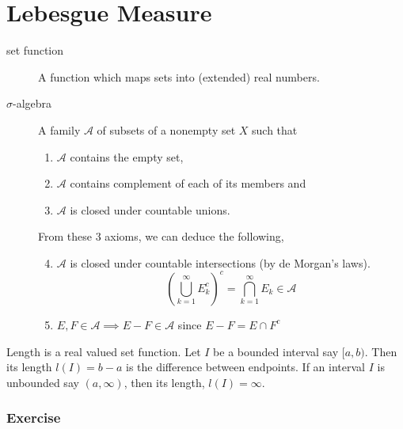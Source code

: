 \section{Lebesgue Measure}
\begin{description}
	\item[set function] A function which maps sets into (extended) real numbers.
	\item[$\sigma$-algebra] A family $\mathcal{A}$ of subsets of a nonempty set $X$ such that
	\begin{enumerate}
		\item $\mathcal{A}$ contains the empty set, 
		\item $\mathcal{A}$ contains complement of each of its members and
		\item $\mathcal{A}$ is closed under countable unions.
	\end{enumerate}
	
	From these 3 axioms, we can deduce the following,
	\begin{enumerate}
		\setcounter{enumi}{3}
		\item $\mathcal{A}$ is closed under countable intersections (by de Morgan's laws).
			$$\left( \bigcup_{k = 1}^\infty E_k^c \right)^c = \bigcap_{k=1}^\infty E_k \in \mathcal{A}$$
		\item $E,F \in \mathcal{A} \implies E-F \in \mathcal{A}$ since $E-F = E \cap F^c$
	\end{enumerate}
\end{description}

\begin{definition}
	Length is a real valued set function.
	Let $I$ be a bounded interval say $[a,b)$.
	Then its length $l(I)=b-a$ is the difference between endpoints.
	If an interval $I$ is unbounded say $(a,\infty)$, then its length, $l(I) = \infty$.
\end{definition}

\subsubsection{Exercise}
